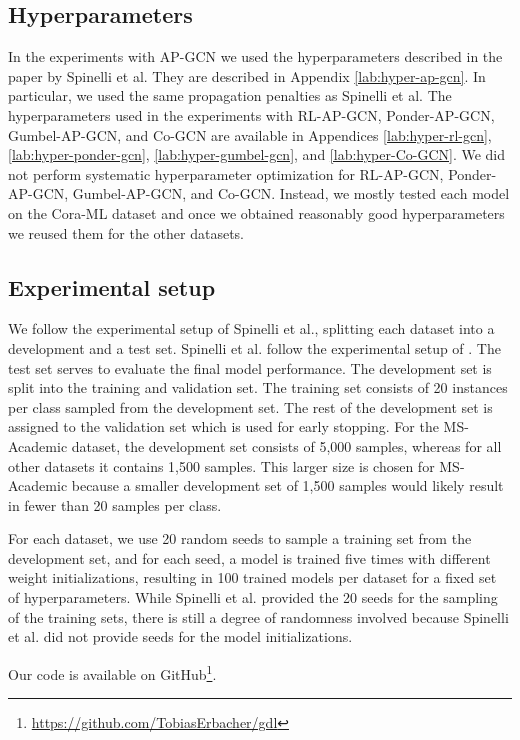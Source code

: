\documentclass{gdl}
\begin{document}
\subsection{Hyperparameters}
In the experiments with AP-GCN we used the hyperparameters described in the paper by Spinelli et al. They are described in Appendix \ref{lab:hyper-ap-gcn}. In particular, we used the same propagation penalties as Spinelli et al. The hyperparameters used in the experiments with RL-AP-GCN, Ponder-AP-GCN, Gumbel-AP-GCN, and Co-GCN are available in Appendices \ref{lab:hyper-rl-gcn}, \ref{lab:hyper-ponder-gcn}, \ref{lab:hyper-gumbel-gcn}, and \ref{lab:hyper-Co-GCN}. We did not perform systematic hyperparameter optimization for RL-AP-GCN, Ponder-AP-GCN, Gumbel-AP-GCN, and Co-GCN. Instead, we mostly tested each model on the Cora-ML dataset and once we obtained reasonably good hyperparameters we reused them for the other datasets. 

\subsection{Experimental setup}
\label{sec:experimental-setup}
We follow the experimental setup of Spinelli et al., splitting each dataset into a development and a test set. Spinelli et al. follow the experimental setup of \cite{Klicpera2019}. The test set serves to evaluate the final model performance. The development set is split into the training and validation set. The training set consists of 20 instances per class sampled from the development set. The rest of the development set is assigned to the validation set which is used for early stopping. For the MS-Academic dataset, the development set consists of 5,000 samples, whereas for all other datasets it contains 1,500 samples. This larger size is chosen for MS-Academic because a smaller development set of 1,500 samples would likely result in fewer than 20 samples per class. 

For each dataset, we use 20 random seeds to sample a training set from the development set, and for each seed, a model is trained five times with different weight initializations, resulting in 100 trained models per dataset for a fixed set of hyperparameters. While Spinelli et al. provided the 20 seeds for the sampling of the training sets, there is still a degree of randomness involved because Spinelli et al. did not provide seeds for the model initializations.

Our code is available on GitHub\footnote{\url{https://github.com/TobiasErbacher/gdl}}.
\end{document}
